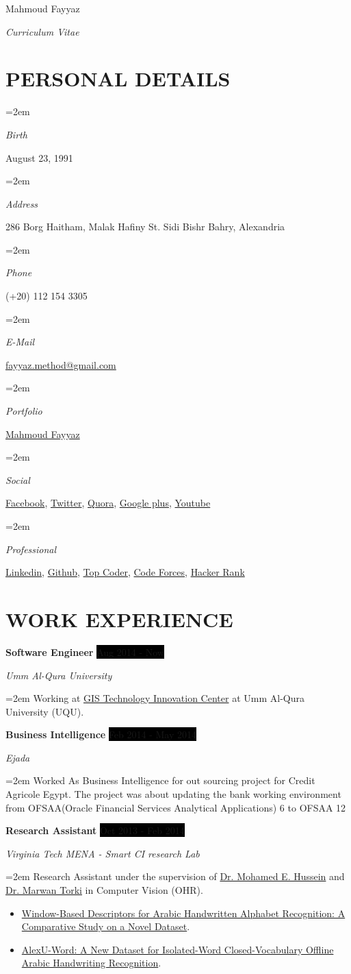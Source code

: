 \documentclass[paper=a4,fontsize=11pt]{scrartcl} %
\newlength{\spacebox}
\newcommand{\sepspace}{\vspace*{0.5em}}		%
\newcommand{\MyName}[1]{ %
		\Huge \usefont{OT1}{phv}{b}{n} \hfill #1
		\par \normalsize \normalfont}
\newcommand{\MySlogan}[1]{ %
		\large \usefont{OT1}{phv}{m}{n}\hfill \textit{#1}
		\par \normalsize \normalfont}
\newcommand{\NewPart}[1]{\section*{\uppercase{#1}}}
\newcommand{\PersonalEntry}[2]{
		\noindent\hangindent=2em\hangafter=0 %
		\parbox{\spacebox}{        %
		\textit{#1}}		       %
		\hspace{1.5em} #2 \par}    %
\newcommand{\EducationEntry}[4]{
		\noindent \textbf{#1} \hfill      %
		\colorbox{Black}{%
			\parbox{6em}{%
			\hfill\color{White}#2}} \par  %
		\noindent \textit{#3} \par        %
		\noindent\hangindent=2em\hangafter=0 \small #4 %
		\normalsize \par}
\newcommand{\WorkEntry}[4]{				  %
		\noindent \textbf{#1} \hfill      %
		\colorbox{Black}{\color{White}#2} \par  %
		\noindent \textit{#3} \par              %
		\noindent\hangindent=2em\hangafter=0 \small #4 %
		\normalsize \par}
\begin{document}

\MyName{Mahmoud Fayyaz}
\MySlogan{Curriculum Vitae}

\sepspace

\NewPart{Personal details}{}

	\PersonalEntry{Birth}{August 23, 1991}
	\PersonalEntry{Address}{286 Borg Haitham, Malak Hafiny St. Sidi Bishr Bahry, Alexandria}
	\PersonalEntry{Phone}{(+20) 112 154 3305}
	\PersonalEntry{E-Mail}{\href{mailto:fayyaz.method@gmail.com}{fayyaz.method@gmail.com}}
	\PersonalEntry{Portfolio}{\href{http://phiiaz.github.io/Resume}{Mahmoud Fayyaz}}
	\PersonalEntry{Social}{\href{https://www.facebook.com/mfayyaz}{Facebook}, \href{https://twitter.com/phiiaz}{Twitter}, \href{http://www.quora.com/Mahmoud-Fayyaz}{Quora}, \href{https://plus.google.com/u/0/+mahmoudfayyaz/about}{Google plus}, \href{https://www.youtube.com/channel/UC2936fDhV38QidvCs1AaCNg}{Youtube}}
	\PersonalEntry{Professional}{\href{http://www.linkedin.com/profile/view?id=95171530&trk=tab_pro}{Linkedin}, \href{https://github.com/phiiaz}{Github}, \href{http://community.topcoder.com/tc?module=MemberProfile&cr=22900634}{Top Coder}, \href{http://www.codeforces.com/profile/fayyaz}{Code Forces}, \href{https://www.hackerrank.com/fayyaz}{Hacker Rank}}


\NewPart{Work experience}{}

	\WorkEntry{Software Engineer}{Aug 2014 - Now}{Umm Al-Qura University}{Working at \href{http://www.gistic.org/}{GIS Technology Innovation Center} at Umm Al-Qura University (UQU).}

	\WorkEntry{Business Intelligence}{Feb 2014 - May 2014}{Ejada}{Worked As Business Intelligence for out sourcing project for Credit Agricole Egypt. The project was about updating the bank working environment from OFSAA(Oracle Financial Services Analytical Applications) 6 to OFSAA 12}

	\WorkEntry{Research Assistant}{Oct 2013 - Feb 2014}{Virginia Tech MENA - Smart CI research Lab}{Research Assistant under the supervision of \href{http://scholar.google.com/citations?user=jCUt0o0AAAAJ&hl=en}{Dr. Mohamed E. Hussein} and \href{http://scholar.google.com/citations?user=aYLNZT4AAAAJ&hl=en}{Dr. Marwan Torki} in Computer Vision (OHR).
	\begin{itemize}
		\item \href{http://arxiv.org/abs/1411.3519}{Window-Based Descriptors for Arabic Handwritten Alphabet Recognition: A Comparative Study on a Novel Dataset}.
		\item \href{http://arxiv.org/abs/1411.4670}{AlexU-Word: A New Dataset for Isolated-Word Closed-Vocabulary Offline Arabic Handwriting Recognition}.
	\end{itemize}}
\end{document}

